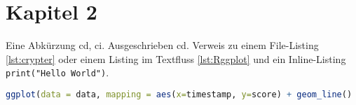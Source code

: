 \chapter{Kapitel 2}
\label{chap:kapitel2}
Eine Abkürzung \ac{cd}, \ac{ci}. Ausgeschrieben \acl{cd}. Verweis zu einem File-Listing \ref{lst:crypter} oder einem Listing im Textfluss \ref{lst:Rggplot} und ein Inline-Listing \lstinline|print("Hello World")|.



\begin{lstlisting}[language=R,caption=Beispielaufruf ldply-Funktion in R, label=lst:Rggplot]
ggplot(data = data, mapping = aes(x=timestamp, y=score) + geom_line()
\end{lstlisting}
			